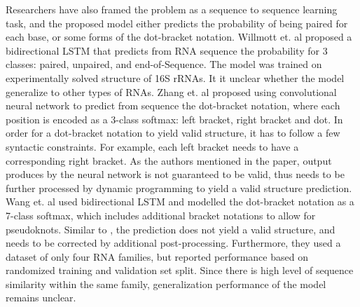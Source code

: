 \documentclass{article}
\begin{document}
Researchers have also framed the problem as a sequence to sequence learning task,
and the proposed model either predicts the probability of being paired for each base,
or some forms of the dot-bracket notation.
Willmott et. al\cite{willmottstate} proposed a bidirectional LSTM that predicts
from RNA sequence the probability for 3 classes: paired, unpaired, and end-of-Sequence.
The model was trained on experimentally solved structure of 16S rRNAs.
It it unclear whether the model generalize to other types of RNAs.
Zhang et. al\cite{zhang2019new} proposed using convolutional neural network to predict from sequence
the dot-bracket notation, where each position is encoded as a 3-class softmax: left bracket, right bracket and dot.
In order for a dot-bracket notation to yield valid structure, it has to follow a few syntactic constraints.
For example, each left bracket needs to have a corresponding right bracket.
As the authors mentioned in the paper, output produces by the neural network
is not guaranteed to be valid, thus needs to be further processed by dynamic programming
to yield a valid structure prediction.
Wang et. al\cite{wang2019dmfold} used bidirectional LSTM and modelled the dot-bracket notation as a
7-class softmax, which includes additional bracket notations to allow for pseudoknots.
Similar to \cite{zhang2019new}, the prediction does not yield a
valid structure, and needs to be corrected by additional post-processing.
Furthermore, they used a dataset of only four RNA families,
but reported performance based on randomized training and validation set split.
Since there is high level of sequence similarity within the same family,
generalization performance of the model remains unclear.






\end{document}

